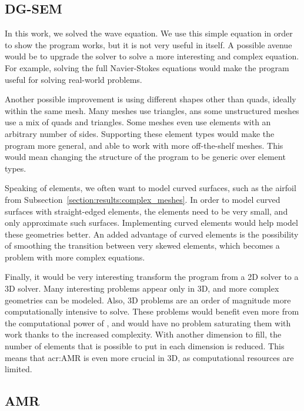 \subsection{DG-SEM}\label{subsection:conclusion:future_work:dg_sem}

In this work, we solved the wave equation. We use this simple equation in order to show the program
works, but it is not very useful in itself. A possible avenue would be to upgrade the solver to
solve a more interesting and complex equation. For example, solving the full Navier-Stokes equations
would make the program useful for solving real-world problems.

Another possible improvement is using different shapes other than quads, ideally within the same
mesh. Many meshes use triangles, ans some unstructured meshes use a mix of quads and triangles. Some
meshes even use elements with an arbitrary number of sides. Supporting these element types would
make the program more general, and able to work with more off-the-shelf meshes. This would mean
changing the structure of the program to be generic over element types.

Speaking of elements, we often want to model curved surfaces, such as the airfoil from
Subsection~\ref{section:results:complex_meshes}. In order to model curved surfaces with
straight-edged elements, the elements need to be very small, and only approximate such surfaces.
Implementing curved elements would help model these geometries better. An added advantage of curved
elements is the possibility of smoothing the transition between very skewed elements, which becomes
a problem with more complex equations.

Finally, it would be very interesting transform the program from a 2D solver to a 3D solver. Many
interesting problems appear only in 3D, and more complex geometries can be modeled. Also, 3D
problems are an order of magnitude more computationally intensive to solve. These problems would
benefit even more from the computational power of , and would have no problem
saturating them with work thanks to the increased complexity. With another dimension to fill, the
number of elements that is possible to put in each dimension is reduced. This means that
\acrshort{acr:AMR} is even more crucial in 3D, as computational resources are limited.

\subsection{AMR}\label{subsection:conclusion:future_work:amr}

